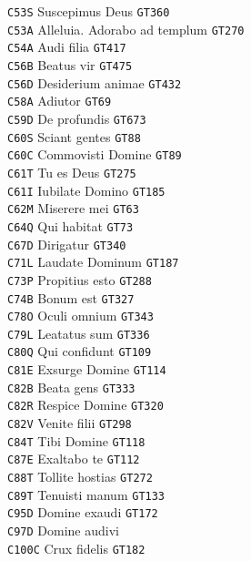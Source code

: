 \documentclass[a4paper]{article}
\begin{document}
{\begin{multicols}{2}
\texttt{C53S} Suscepimus Deus \texttt{GT360}\\
\texttt{C53A} Alleluia. Adorabo ad templum \texttt{GT270}\\
\texttt{C54A} Audi filia \texttt{GT417}\\
\texttt{C56B} Beatus vir \texttt{GT475}\\
\texttt{C56D} Desiderium animae \texttt{GT432}\\
\texttt{C58A} Adiutor \texttt{GT69}\\
\texttt{C59D} De profundis \texttt{GT673}\\
\texttt{C60S} Sciant gentes \texttt{GT88}\\
\texttt{C60C} Commovisti Domine \texttt{GT89}\\
\texttt{C61T} Tu es Deus \texttt{GT275}\\
\texttt{C61I} Iubilate Domino \texttt{GT185}\\
\texttt{C62M} Miserere mei \texttt{GT63}\\
\texttt{C64Q} Qui habitat \texttt{GT73}\\
\texttt{C67D} Dirigatur \texttt{GT340}\\
\texttt{C71L} Laudate Dominum \texttt{GT187}\\
\texttt{C73P} Propitius esto \texttt{GT288}\\
\texttt{C74B} Bonum est \texttt{GT327}\\
\texttt{C78O} Oculi omnium \texttt{GT343}\\
\texttt{C79L} Leatatus sum \texttt{GT336}\\
\texttt{C80Q} Qui confidunt \texttt{GT109}\\
\texttt{C81E} Exsurge Domine \texttt{GT114}\\
\texttt{C82B} Beata gens \texttt{GT333}\\
\texttt{C82R} Respice Domine \texttt{GT320}\\
\texttt{C82V} Venite filii \texttt{GT298}\\
\texttt{C84T} Tibi Domine \texttt{GT118}\\
\texttt{C87E} Exaltabo te \texttt{GT112}\\
\texttt{C88T} Tollite hostias \texttt{GT272}\\
\texttt{C89T} Tenuisti manum \texttt{GT133}\\
\texttt{C95D} Domine exaudi \texttt{GT172}\\
\texttt{C97D} Domine audivi\\
\texttt{C100C} Crux fidelis \texttt{GT182}\\

\end{multicols}}
\end{document}

